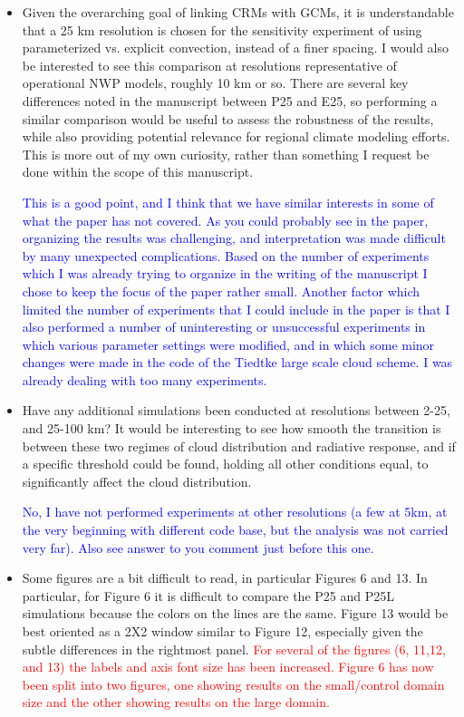 \documentclass[draft]{agujournal2019}
\begin{document}
\begin{itemize}
  \item Given the overarching goal of linking CRMs with GCMs, it is understandable that a 25 km resolution is chosen for the sensitivity experiment of using parameterized vs. explicit convection, instead of a finer spacing. I would also be interested to see this comparison at resolutions representative of operational NWP models, roughly 10 km or so. There are several key differences noted in the manuscript between P25 and E25, so performing a similar comparison would be useful to assess the robustness of the results, while also providing potential relevance for regional climate modeling efforts. This is more out of my own curiosity, rather than something I request be done within the scope of this manuscript.  

  \textcolor{blue}{This is a good point, and I think that we have similar interests in some of what the paper has not covered.  As you could probably see in the paper, organizing the results was challenging, and interpretation was made difficult by many unexpected complications.  Based on the number of experiments which I was already trying to organize in the writing of the manuscript I chose to keep the focus of the paper rather small.   Another factor which limited the number of experiments that I could include in the paper is that I also performed a number of uninteresting or unsuccessful experiments in which various parameter settings were modified, and in which some minor changes were made in the code of the Tiedtke large scale cloud scheme.  I was already dealing with too many experiments. }

  \item Have any additional simulations been conducted at resolutions between 2-25, and 25-100 km? It would be interesting to see how smooth the transition is between these two regimes of cloud distribution and radiative response, and if a specific threshold could be found, holding all other conditions equal, to significantly affect the cloud distribution.  

  \textcolor{blue}{No, I have not performed experiments at other resolutions (a few at 5km, at the very beginning with different code base, but the analysis was not carried very far).  Also see answer to you comment just before this one. }

  \item Some figures are a bit difficult to read, in particular Figures 6 and 13. In particular, for Figure 6 it is difficult to compare the P25 and P25L simulations because the colors on the lines are the same. Figure 13 would be best oriented as a 2X2 window similar to Figure 12, especially given the subtle differences in the rightmost panel.
  \textcolor{red}{For several of the figures (6, 11,12, and 13) the labels and axis font size has been increased.  Figure 6 has now been split into two figures, one
  showing results on the small/control domain size and the other showing results on the large domain.}


\end{itemize}
\end{document}
